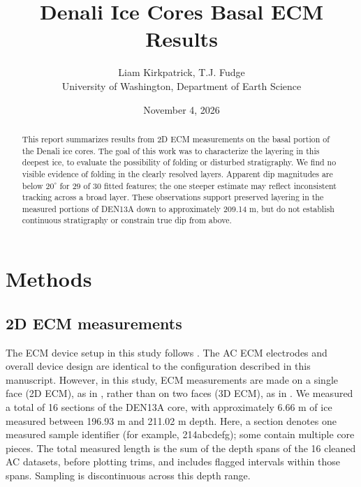 \documentclass[11pt,letterpaper]{article}
\title{Denali Ice Cores Basal ECM Results}
\author{Liam Kirkpatrick, T.J. Fudge \\ University of Washington, Department of Earth Science}
\date{November 4, 2026}
\begin{document}
\maketitle


\begin{abstract}
This report summarizes results from 2D ECM measurements on the basal portion of the Denali ice cores. The goal of this work was to characterize the layering in this deepest ice, to evaluate the possibility of folding or disturbed stratigraphy. We find no visible evidence of folding in the clearly resolved layers. Apparent dip magnitudes are below $20^\circ$ for 29 of 30 fitted features; the one steeper estimate may reflect inconsistent tracking across a broad layer. These observations support preserved layering in the measured portions of DEN13A down to approximately 209.14 m, but do not establish continuous stratigraphy or constrain true dip from above.
\end{abstract}

\section{Methods}

\subsection{2D ECM measurements}

The ECM device setup in this study follows \textcite{kirkpatrick_three-dimensional_2025}. The AC ECM electrodes and overall device design are identical to the configuration described in this manuscript. However, in this study, ECM measurements are made on a single face (2D ECM), as in \textcite{fudge_electrical_2016}, rather than on two faces (3D ECM), as in \textcite{kirkpatrick_three-dimensional_2025}. We measured a total of 16 sections of the DEN13A core, with approximately 6.66 m of ice measured between 196.93 m and 211.02 m depth. Here, a section denotes one measured sample identifier (for example, 214abcdefg); some contain multiple core pieces. The total measured length is the sum of the depth spans of the 16 cleaned AC datasets, before plotting trims, and includes flagged intervals within those spans. Sampling is discontinuous across this depth range.
\end{document}
